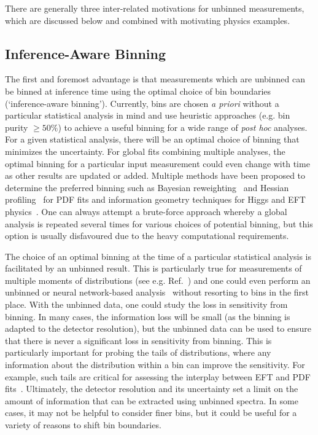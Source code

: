 \documentclass[a4paper,11pt]{article}
\begin{document}
There are generally three inter-related motivations for unbinned measurements, which are discussed below and combined with motivating physics examples. 

\subsection{Inference-Aware Binning}

 The first and foremost advantage is that measurements which are unbinned can be binned at inference time using the optimal choice of bin boundaries (`inference-aware binning').  Currently, bins are chosen \textit{a priori} without a particular statistical analysis in mind and use heuristic approaches (e.g. bin purity $\geq 50\%$) to achieve a useful binning for a wide range of \textit{post hoc} analyses.  For a given statistical analysis, there will be an optimal choice of binning that minimizes the uncertainty.  For global fits combining multiple analyses, the optimal binning for a particular input measurement could even change with time as other results are updated or added.  Multiple methods have been proposed to determine the preferred binning such as Bayesian reweighting~\cite{Ball:2011gg} and Hessian profiling~\cite{Paukkunen:2014zia} for PDF fits and information geometry techniques for Higgs and EFT physics~\cite{Brehmer:2016nyr}.  One can always attempt a brute-force approach
	whereby a global analysis is repeated
	several times for various choices
	of potential binning, but
	this option is usually disfavoured due to the heavy computational requirements.

The choice of an optimal binning at the time of a particular statistical analysis is facilitated by an unbinned result.  This is particularly true for measurements of multiple moments of distributions (see e.g. Ref.~\cite{CLAS:2009ngd,1509.05190}) and one could even perform an unbinned or neural network-based analysis~\cite{Chen:2020mev,DAgnolo:2018cun,DAgnolo:2019vbw,Brehmer:2018hga,Brehmer:2018kdj,Brehmer:2018eca,Nachman:2019dol} without resorting to bins in the first place.  With the unbinned data, one could study the loss in sensitivity from binning.  In many cases, the information loss will be small (as the binning is adapted to the detector resolution), but the unbinned data can be used to ensure that there is never a significant loss in sensitivity from binning.  This is particularly important for probing the tails of distributions, where any information about the distribution within a bin can improve the sensitivity.  For example, such tails are critical for assessing the interplay between EFT
and PDF fits~\cite{Greljo:2021kvv}.  Ultimately, the detector resolution and its uncertainty set a limit on the amount of information that can be extracted using unbinned spectra.  In some cases, it may not be helpful to consider finer bins, but it could be useful for a variety of reasons to shift bin boundaries. 
\end{document}
